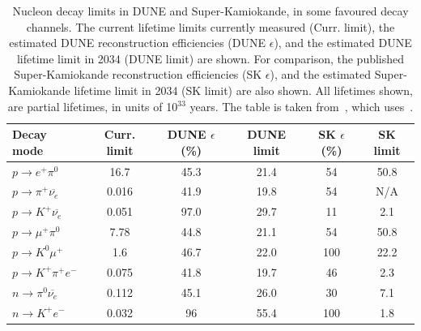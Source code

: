 \begin{table}
  \caption[Nucleon decay limits in DUNE and Super-Kamiokande, in some favoured decay channels]
          {Nucleon decay limits in DUNE and Super-Kamiokande, in some favoured decay channels. The current lifetime limits currently measured (Curr. limit), the estimated DUNE reconstruction efficiencies (DUNE $\epsilon$), and the estimated DUNE lifetime limit in 2034 (DUNE limit) are shown. For comparison, the published Super-Kamiokande reconstruction efficiencies (SK $\epsilon$), and the estimated Super-Kamiokande lifetime limit in 2034 (SK limit) are also shown. All lifetimes shown, are partial lifetimes, in units of 10$^{33}$ years. The table is taken from~\citep{MauryLifetime}, which uses~\citep{PDGReview}.}
  \centering
  \label{tab:NDKLim}
  \begin{tabular}{l c c c c c}
    \toprule
    {Decay mode}                               & {Curr. limit} & {DUNE $\epsilon$ (\%)} & {DUNE limit} & {SK $\epsilon$ (\%)} & {SK limit} \\ 
    \midrule
    $p \rightarrow e^{+} \pi^{0}$              & 16.7          & 45.3              & 21.4         & 54              & 50.8       \\
    
    $p \rightarrow \pi^{+} \overline{\nu_{e}}$ & 0.016         & 41.9              & 19.8         & 54              & N/A        \\
    
    $p \rightarrow K^{+} \overline{\nu_{e}}$   & 0.051         & 97.0              & 29.7         & 11              & 2.1        \\
    
    $p \rightarrow \mu^{+} \pi^{0}$            & 7.78          & 44.8              & 21.1         & 54              & 50.8       \\
    
    $p \rightarrow K^{0} \mu^{+}$              & 1.6           & 46.7              & 22.0         & 100             & 22.2       \\

    $p \rightarrow K^{+} \pi^{+} e^{-}$        & 0.075         & 41.8              & 19.7         & 46              & 2.3        \\
    
    $n \rightarrow \pi^{0} \overline{\nu_{e}}$ & 0.112         & 45.1              & 26.0         & 30              & 7.1        \\
    
    $n \rightarrow K^{+} e^{-}$                & 0.032         & 96                & 55.4         & 100             & 1.8        \\
    \bottomrule
  \end{tabular}
\end{table}

